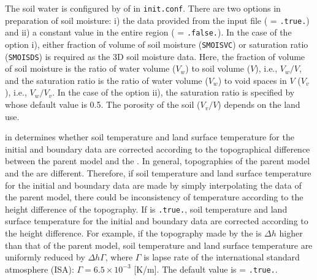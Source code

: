 The soil water is configured by  of  in \verb|init.conf|.
There are two options in preparation of soil moisture: i) the data provided from the input file ( = \verb|.true.|) and ii) a constant value in the entire region ( = \verb|.false.|).
In the case of the option i), either fraction of volume of soil moisture (\verb|SMOISVC|) or saturation ratio (\verb|SMOISDS|) is required as the 3D soil moisture data.
Here, the fraction of volume of soil moisture is the ratio of water volume ($V_w$) to soil volume ($V$), i.e., $V_w / V$,
and the saturation ratio is the ratio of water volume ($V_w$) to void spaces in $V$ ($V_v$), i.e., $V_w / V_v$.
%
In the case of the option ii), the saturation ratio is specified by  whose default value is 0.5.
The porosity of the soil ($V_v/V$) depends on the land use.

 in  determines
whether soil temperature and land surface temperature for the initial and boundary data are corrected
according to the topographical difference between the parent model and the \scalerm.
In general, topographies of the parent model and the \scalerm are different.
Therefore, if soil temperature and land surface temperature for the initial and boundary data are made by simply interpolating the data of the parent model,
there could be inconsistency of temperature according to the height difference of the topography.
If  is \verb|.true.|,
soil temperature and land surface temperature for the initial and boundary data are corrected according to the height difference.
For example, if the topography made by the \scalerm is $\Delta h$ higher than that of the parent model,
soil temperature and land surface temperature are uniformly reduced by $\Delta h\Gamma$,
where $\Gamma$ is lapse rate of the international standard atmosphere (ISA): $\Gamma=6.5\times 10^{-3}$ [K/m].
The default value is  = \verb|.true.|.

